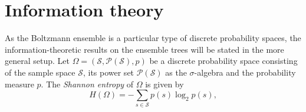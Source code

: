 \documentclass[preprint,authoryear]{elsarticle}
\begin{document}
\section{Information theory}
As the Boltzmann ensemble is a particular type of discrete probability spaces,
the information-theoretic results on the ensemble trees will be stated in the more general setup.
Let  $\Omega=(\mathcal{S},\mathcal{P}(\mathcal{S}),p)$ be a discrete probability space
consisting of the sample space $\mathcal{S}$, its power set $\mathcal{P}(\mathcal{S})$ as the $\sigma$-algebra
and the probability measure $p$.
The \emph{Shannon entropy} of $\Omega$ is given by 
\begin{equation*}
H(\Omega) = -\sum_{s\in \mathcal{S}} p(s) \log_2 p(s),
\end{equation*}
\end{document}
